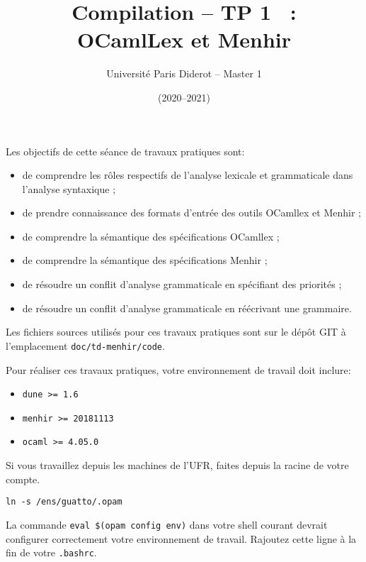 \documentclass{article}
\title{Compilation -- TP 1 ~: \\ OCamlLex et Menhir}
\author{Université Paris Diderot -- Master 1}
\date{(2020--2021)}
\begin{document}
\maketitle

Les objectifs de cette séance de travaux pratiques sont:
\begin{itemize}
\item[\faSignIn]
de comprendre les rôles respectifs de l'analyse lexicale et grammaticale
dans l'analyse syntaxique ;

\item[\faSignIn]
de prendre connaissance des formats d'entrée des outils OCamllex et Menhir ;

\item[\faSignIn]
de comprendre la sémantique des spécifications OCamllex ;

\item[\faSignIn]
de comprendre la sémantique des spécifications Menhir ;

\item[\faSignIn]
de résoudre un conflit d'analyse grammaticale en spécifiant
des priorités ;

\item[\faSignIn]
de résoudre un conflit d'analyse grammaticale en réécrivant
une grammaire.

\end{itemize}

\medskip

Les fichiers sources utilisés pour ces travaux pratiques sont sur le dépôt GIT à
l'emplacement \verb!doc/td-menhir/code!.

Pour réaliser ces travaux pratiques, votre environnement de travail doit
inclure:
%
\begin{itemize}
\item \verb!dune >= 1.6!
\item \verb!menhir >= 20181113!
\item \verb!ocaml >= 4.05.0!
\end{itemize}

Si vous travaillez depuis les machines de l'UFR, faites depuis la racine
de votre compte.
%
\begin{verbatim}
ln -s /ens/guatto/.opam
\end{verbatim}

La commande \verb!eval $(opam config env)! dans votre shell courant devrait
configurer correctement votre environnement de travail. Rajoutez cette ligne
à la fin de votre \verb!.bashrc!.
\end{document}
